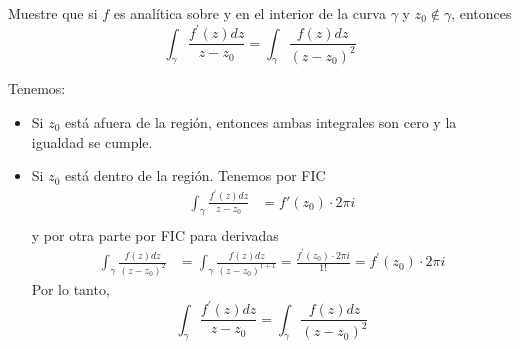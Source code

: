 \begin{problema}
    Muestre que si $f$ es analítica sobre y en el interior de la curva $\gamma$ y $z_0 \notin \gamma$, entonces
$$
\int_\gamma \frac{f^{\prime}(z) d z}{z-z_0}=\int_\gamma \frac{f(z) d z}{\left(z-z_0\right)^2}
$$
\begin{dem}
    Tenemos: 
    \begin{itemize}
        \item Si $z_0$ está afuera de la región, entonces ambas integrales son cero y la igualdad se cumple.
        \item Si $z_0$ está dentro de la región. Tenemos por FIC
        \begin{align*}
            \int_\gamma \frac{f^{\prime}(z) d z}{z-z_0}&= f'(z_0)\cdot 2\pi i\\
        \end{align*}
        y por otra parte por FIC para derivadas 
        \begin{align*}
            \int_\gamma \frac{f(z) d z}{\left(z-z_0\right)^2} &= \int_\gamma \frac{f(z) d z}{\left(z-z_0\right)^{1+1}} = \frac{f^{\prime}(z_0)\cdot 2\pi i }{1!}=f^{\prime}(z_0)\cdot 2\pi i 
            \end{align*}
        Por lo tanto, 
        $$
    \int_\gamma \frac{f^{\prime}(z) d z}{z-z_0}=\int_\gamma \frac{f(z) d z}{\left(z-z_0\right)^2}
    $$
    \end{itemize}
    
\end{dem}
\end{problema}

